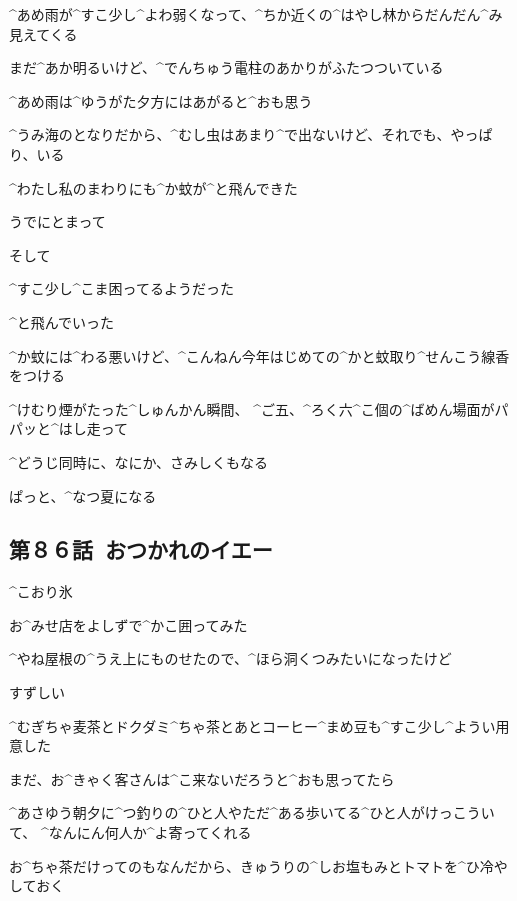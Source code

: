 \page[123]
\Alpha ^{あめ}{雨}が^{すこ}{少}し^{よわ}{弱}くなって、^{ちか}{近}くの^{はやし}{林}からだんだん^{み}{見}えてくる

\Alpha まだ^{あか}{明}るいけど、^{でんちゅう}{電柱}のあかりがふたつついている

\Alpha ^{あめ}{雨}は^{ゆうがた}{夕方}にはあがると^{おも}{思}う

\page[124]
\Alpha ^{うみ}{海}のとなりだから、^{むし}{虫}はあまり^{で}{出}ないけど、それでも、やっぱり、いる

\page[125]
\Alpha ^{わたし}{私}のまわりにも^{か}{蚊}が^{と}{飛}んできた

\Alpha うでにとまって

\Alpha そして

\Alpha ^{すこ}{少}し^{こま}{困}ってるようだった

\Alpha ^{と}{飛}んでいった

\page[126]
\Alpha ^{か}{蚊}には^{わる}{悪}いけど、^{こんねん}{今年}はじめての^{かと}{蚊取}り^{せんこう}{線香}をつける

\page[127]
\Alpha ^{けむり}{煙}がたった^{しゅんかん}{瞬間}、
^{ご}{五}、^{ろく}{六}^{こ}{個}の^{ばめん}{場面}がパパッと^{はし}{走}って

\Alpha ^{どうじ}{同時}に、なにか、さみしくもなる

\page[128]
\Alpha ぱっと、^{なつ}{夏}になる


\subsection{第８６話\ おつかれのイエー}

\page[131]
\Sign ^{こおり}{氷}

\Alpha お^{みせ}{店}をよしずで^{かこ}{囲}ってみた

\page[132]
\Alpha ^{やね}{屋根}の^{うえ}{上}にものせたので、^{ほら}{洞}くつみたいになったけど

\Alpha すずしい

\Alpha ^{むぎちゃ}{麦茶}とドクダミ^{ちゃ}{茶}とあとコーヒー^{まめ}{豆}も^{すこ}{少}し^{ようい}{用意}した

\Alpha まだ、お^{きゃく}{客}さんは^{こ}{来}ないだろうと^{おも}{思}ってたら

\Alpha ^{あさゆう}{朝夕}に^{つ}{釣}りの^{ひと}{人}やただ^{ある}{歩}いてる^{ひと}{人}がけっこういて、
^{なんにん}{何人}か^{よ}{寄}ってくれる

\page[133]
\Alpha お^{ちゃ}{茶}だけってのもなんだから、きゅうりの^{しお}{塩}もみとトマトを^{ひ}{冷}やしておく

